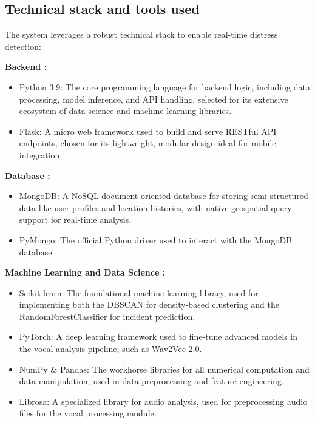 \documentclass[12pt,a4paper,oneside,english]{book}
\begin{document}
{\subsection{Technical stack and tools used}
The system leverages a robust technical stack to enable real-time distress detection:

\textbf{Backend :}
\begin{itemize}
    \item Python 3.9: The core programming language for backend logic, including data processing, model inference, and API handling, selected for its extensive ecosystem of data science and machine learning libraries.
    \item Flask: A micro web framework used to build and serve RESTful API endpoints, chosen for its lightweight, modular design ideal for mobile integration.
\end{itemize}

\textbf{Database :}
\begin{itemize}
\item MongoDB: A NoSQL document-oriented database for storing semi-structured data like user profiles and location histories, with native geospatial query support for real-time analysis.
\item PyMongo: The official Python driver used to interact with the MongoDB database.
\end{itemize}

\textbf{Machine Learning and Data Science :}

\begin{itemize}

\item Scikit-learn: The foundational machine learning library, used for implementing both the DBSCAN for density-based clustering and the RandomForestClassifier for incident prediction.
\item PyTorch: A deep learning framework used to fine-tune advanced models in the vocal analysis pipeline, such as Wav2Vec 2.0.
\item NumPy \& Pandas: The workhorse libraries for all numerical computation and data manipulation, used in data preprocessing and feature engineering.
\item Librosa: A specialized library for audio analysis, used for preprocessing audio files for the vocal processing module.
\end{itemize}

}
\end{document}
